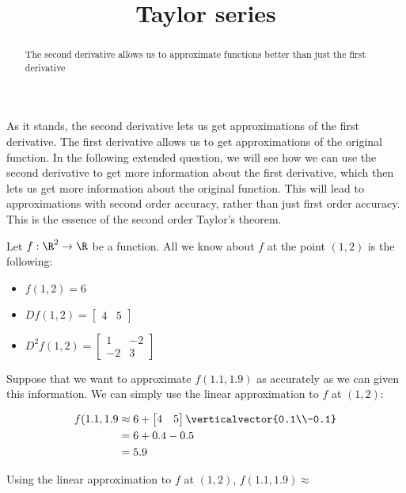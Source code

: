 \documentclass{article}
\title{Taylor series}
\begin{document}
	\begin{abstract}
		The second derivative allows us to approximate functions better than just the first derivative
	\end{abstract}
	
	As it stands, the second derivative lets us get approximations of the first derivative.  The first derivative allows us to get approximations of the original function.
	In the following extended question, we will see how we can use the second derivative to get more information about the first derivative, which then lets us get more
	information about the original function.  This will lead to approximations with second order accuracy, rather than just first order accuracy.  This is the essence of 
	the second order Taylor's theorem.
	
	\begin{question}
	Let $f:\R^2 \to \R$ be a function.  All we know about $f$ at the point $(1,2)$ is the following:
		\begin{itemize}
			\item $f(1,2) = 6$
			\item \(Df(1,2) = \begin{bmatrix} 4 & 5 \end{bmatrix}\)
			\item \( D^2f(1,2)  = \begin{bmatrix} 1 & -2 \\ -2 & 3\end{bmatrix}\)
		\end{itemize} 
		
		Suppose that we want to approximate $f(1.1,1.9)$ as accurately as we can given this information.
		We can simply use the linear approximation to $f$ at $(1,2)$:
		
		\begin{solution}
			\begin{hint}
				\begin{align*}
					f(1.1,1.9 &\approx 6+\begin{bmatrix} 4 & 5 \end{bmatrix} \verticalvector{0.1\\-0.1}\\
							&=6+0.4-0.5\\
							&=5.9
				\end{align*}
			\end{hint}
			Using the linear approximation to $f$ at $(1,2)$, $f(1.1,1.9) \approx$ 
		\end{solution}
		

\end{question}
\end{document}

